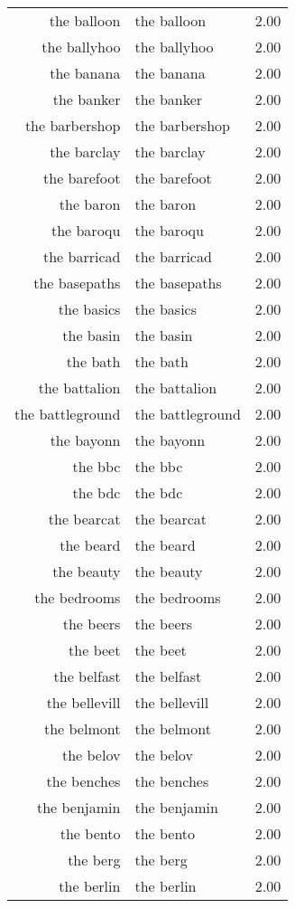 \begin{table}[ht]
\begin{tabular}{rlr}
  the balloon & the balloon & 2.00 \\ 
  the ballyhoo & the ballyhoo & 2.00 \\ 
  the banana & the banana & 2.00 \\ 
  the banker & the banker & 2.00 \\ 
  the barbershop & the barbershop & 2.00 \\ 
  the barclay & the barclay & 2.00 \\ 
  the barefoot & the barefoot & 2.00 \\ 
  the baron & the baron & 2.00 \\ 
  the baroqu & the baroqu & 2.00 \\ 
  the barricad & the barricad & 2.00 \\ 
  the basepaths & the basepaths & 2.00 \\ 
  the basics & the basics & 2.00 \\ 
  the basin & the basin & 2.00 \\ 
  the bath & the bath & 2.00 \\ 
  the battalion & the battalion & 2.00 \\ 
  the battleground & the battleground & 2.00 \\ 
  the bayonn & the bayonn & 2.00 \\ 
  the bbc & the bbc & 2.00 \\ 
  the bdc & the bdc & 2.00 \\ 
  the bearcat & the bearcat & 2.00 \\ 
  the beard & the beard & 2.00 \\ 
  the beauty & the beauty & 2.00 \\ 
  the bedrooms & the bedrooms & 2.00 \\ 
  the beers & the beers & 2.00 \\ 
  the beet & the beet & 2.00 \\ 
  the belfast & the belfast & 2.00 \\ 
  the bellevill & the bellevill & 2.00 \\ 
  the belmont & the belmont & 2.00 \\ 
  the belov & the belov & 2.00 \\ 
  the benches & the benches & 2.00 \\ 
  the benjamin & the benjamin & 2.00 \\ 
  the bento & the bento & 2.00 \\ 
  the berg & the berg & 2.00 \\ 
  the berlin & the berlin & 2.00 \\ 

\end{tabular}
\end{table}
